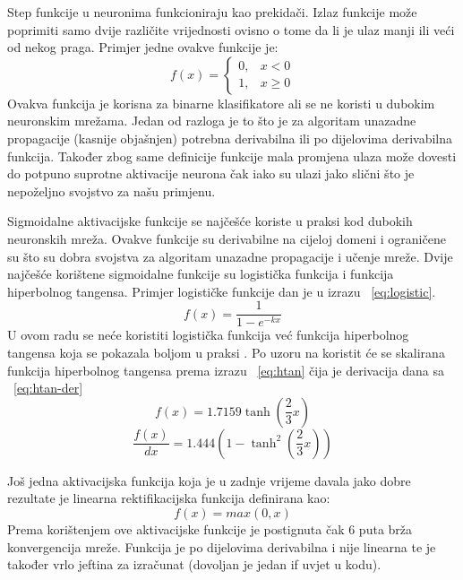 \documentclass[times, utf8, zavrsni, numeric]{fer}
\begin{document}
Step funkcije u neuronima funkcioniraju kao prekidači. Izlaz funkcije može poprimiti samo dvije različite vrijednosti ovisno o tome da li je ulaz manji ili veći od nekog praga. Primjer jedne ovakve funkcije je:
\begin{equation}
  f(x) = \begin{cases}
    0, & \text{$x<0$}\\
    1, & \text{$x\geq0$}
  \end{cases}
\end{equation}
Ovakva funkcija je korisna za binarne klasifikatore ali se ne koristi u dubokim neuronskim mrežama. Jedan od razloga je to što je za algoritam unazadne propagacije (kasnije objašnjen) potrebna derivabilna ili po dijelovima derivabilna funkcija. Također zbog same definicije funkcije mala promjena ulaza može dovesti do potpuno suprotne aktivacije neurona čak iako su ulazi jako slični što je nepoželjno svojstvo za našu primjenu.

Sigmoidalne aktivacijske funkcije se najčešće koriste u praksi kod dubokih neuronskih mreža. Ovakve funkcije su derivabilne na cijeloj domeni i ograničene su što su dobra svojstva za algoritam unazadne propagacije i učenje mreže. Dvije najčešće korištene sigmoidalne funkcije su logistička funkcija i funkcija hiperbolnog tangensa. Primjer logističke funkcije dan je u izrazu ~\ref{eq:logistic}. 
\begin{equation}\label{eq:logistic}
f(x) = \frac{1}{1-e^{-kx}}
\end{equation}
U ovom radu se neće koristiti logistička funkcija već funkcija hiperbolnog tangensa koja se pokazala boljom u praksi \citep{lecun1998gradient}. Po uzoru na \citep{lecun1998gradient} koristit će se skalirana funkcija hiperbolnog tangensa prema izrazu ~\ref{eq:htan} čija je derivacija dana sa ~\ref{eq:htan-der}
\begin{equation}\label{eq:htan}
f(x) = 1.7159\tanh\left(\frac{2}{3}x\right)
\end{equation}
\begin{equation}\label{eq:htan-der}
\dfrac{f(x)}{dx} = 1.444\left(1-\tanh^2\left(\frac{2}{3}x\right)\right)
\end{equation}

Još jedna aktivacijska funkcija koja je u zadnje vrijeme davala jako dobre rezultate je linearna rektifikacijska funkcija definirana kao:
\begin{equation}\label{eq:relu}
f(x) = max(0, x)
\end{equation}
Prema \citep{krizhevsky2012imagenet} korištenjem ove aktivacijske funkcije je postignuta čak 6 puta brža konvergencija mreže. Funkcija je po dijelovima derivabilna i nije linearna te je također vrlo jeftina za izračunat (dovoljan je jedan if uvjet u kodu).
\end{document}
